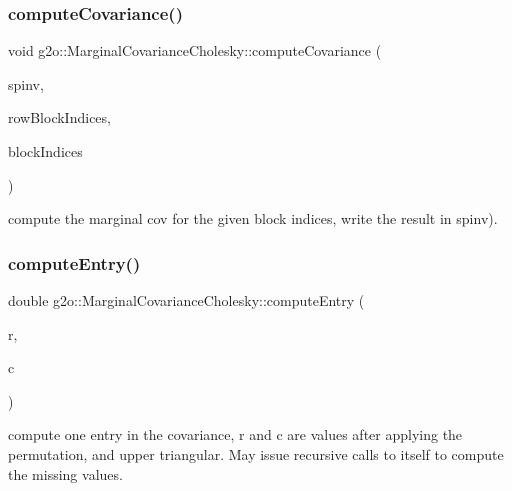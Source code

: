 \subsubsection{\texorpdfstring{compute\+Covariance()}{computeCovariance()}\hspace{0.1cm}{\footnotesize\ttfamily [2/2]}}
{\footnotesize\ttfamily void g2o\+::\+Marginal\+Covariance\+Cholesky\+::compute\+Covariance (\begin{DoxyParamCaption}\item[{\mbox{\hyperlink{classg2o_1_1_sparse_block_matrix}{Sparse\+Block\+Matrix}}$<$ Matrix\+Xd $>$ \&}]{spinv,  }\item[{const std\+::vector$<$ int $>$ \&}]{row\+Block\+Indices,  }\item[{const std\+::vector$<$ std\+::pair$<$ int, int $>$ $>$ \&}]{block\+Indices }\end{DoxyParamCaption})}

compute the marginal cov for the given block indices, write the result in spinv). \mbox{\label{classg2o_1_1_marginal_covariance_cholesky_a556f8da80f0873b74b57c82b587b4f97}} 
\subsubsection{\texorpdfstring{compute\+Entry()}{computeEntry()}}
{\footnotesize\ttfamily double g2o\+::\+Marginal\+Covariance\+Cholesky\+::compute\+Entry (\begin{DoxyParamCaption}\item[{int}]{r,  }\item[{int}]{c }\end{DoxyParamCaption})\hspace{0.3cm}{\ttfamily [protected]}}

compute one entry in the covariance, r and c are values after applying the permutation, and upper triangular. May issue recursive calls to itself to compute the missing values. \mbox{\label{classg2o_1_1_marginal_covariance_cholesky_a9b0816374af957f23aa2d6b015e4b9bf}} 
